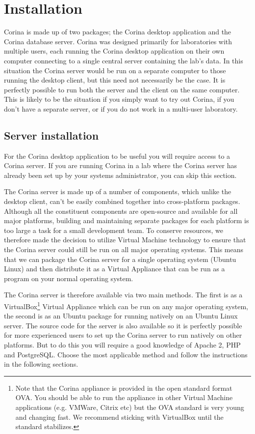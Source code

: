 
\chapter{Installation}
\label{txt:installation}
Corina is made up of two packages; the Corina desktop application and the Corina database server.  Corina was designed primarily for laboratories with multiple users, each running the Corina desktop application on their own computer connecting to a single central server containing the lab's data.  In this situation the Corina server would be run on a separate computer to those running the desktop client, but this need not necessarily be the case.  It is perfectly possible to run both the server and the client on the same computer.  This is likely to be the situation if you simply want to try out Corina, if you don't have a separate server, or if you do not work in a multi-user laboratory.


\section{Server installation}
For the Corina desktop application to be useful you will require access to a Corina server.  If you are running Corina in a lab where the Corina server has already been set up by your systems administrator, you can skip this section.

The Corina server is made up of a number of components, which unlike the desktop client, can't be easily combined together into cross-platform packages.  Although all the constituent components are open-source and available for all major platforms, building and maintaining separate packages for each platform is too large a task for a small development team.  To conserve resources, we therefore made the decision to utilize Virtual Machine technology to ensure that the Corina server could still be run on all major operating systems.  This means that we can package the Corina server for a single operating system (Ubuntu Linux) and then distribute it as a Virtual Appliance that can be run as a program on your normal operating system. 

The Corina server is therefore available via two main methods.  The first is as a VirtualBox\footnote{Note that the Corina appliance is provided in the open standard format OVA.  You should be able to run the appliance in other Virtual Machine applications (e.g. VMWare, Citrix etc) but the OVA standard is very young and changing fast.  We recommend sticking with VirtualBox until the standard stabilizes. } Virtual Appliance which can be run on any major operating system, the second is as an Ubuntu package for running natively on an Ubuntu Linux server.  The source code for the server is also available so it is perfectly possible for more experienced users to set up the Corina server to run natively on other platforms.  But to do this you will require a good knowledge of Apache 2, PHP and PostgreSQL.  Choose the most applicable method and follow the instructions in the following sections.


